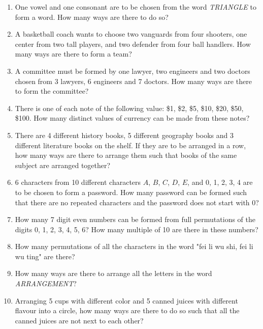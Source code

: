 \documentclass{report}
\begin{document}
\begin{multicols}{2}
\begin{enumerate}
    \item One vowel and one consonant are to be chosen from the word \textit{TRIANGLE} to
          form a word. How many ways are there to do so?

    \item A basketball coach wants to choose two vanguards from four shooters, one center
          from two tall players, and two defender from four ball handlers. How many ways
          are there to form a team?

    \item A committee must be formed by one lawyer, two engineers and two doctors chosen
          from 3 lawyers, 6 engineers and 7 doctors. How many ways are there to form the
          committee?

    \item  There is one of each note of the following value: \$1, \$2, \$5, \$10, \$20,
          \$50, \$100. How many distinct values of currency can be made from these notes?

    \item There are 4 different history books, 5 different geography books and 3
          different literature books on the shelf. If they are to be arranged in a row,
          how many ways are there to arrange them such that books of the same subject are
          arranged together?

    \item 6 characters from 10 different characters $A$, $B$, $C$, $D$, $E$, and 0, 1, 2, 3, 4 are to be chosen to form a password. How many password can be formed such that there are no repeated characters and the password does not start with 0?

    \item How many 7 digit even numbers can be formed from full permutations of the
          digits 0, 1, 2, 3, 4, 5, 6? How many multiple of 10 are there in these numbers?

    \item How many permutations of all the characters in the word "fei li wu shi, fei li
          wu ting" are there?

    \item How many ways are there to arrange all the letters in the word
          \textit{ARRANGEMENT}?

    \item Arranging 5 cups with different color and 5 canned juices with different
          flavour into a circle, how many ways are there to do so such that all the
          canned juices are not next to each other?


\end{enumerate}
\end{multicols}
\end{document}
